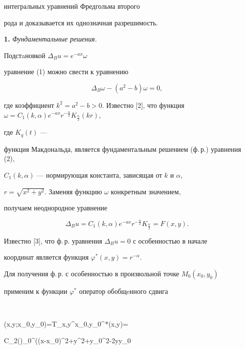интегральных уравнений Фредгольма второго


рода и доказывается их однозначная разрешимость.


 


{\bf 1.} {\it Фундаментальные решения.}


Подстaновкой $\Delta_{B}u=e^{-ax}\omega$


уравнение (1) можно свести к уравнению


\begin{equation}


\Delta_{B}\omega-(a^{2}-b)\omega=0,


\end{equation}


где коэффициент $k^{2}=a^{2}-b>0$. Известно [2], что функция $\omega=C_{1}(k,


\alpha)e^{-ax}r^{-\frac{\alpha}{2}}K_{\frac{\alpha}{2}}(kr)$,


где $K_{q}(t)$ ---


функция Макдональда, является фундаментальным решением (ф.\,р.) уравнения (2),


$C_{1}(k,\alpha)$ --- нормирующая константа, зависящая от $k$ и $\alpha$,


$r=\sqrt{x^{2}+y^{2}}$. Заменяя функцию $\omega$ конкретным значением,


получаем неоднородное уравнение


\begin{equation}


\Delta_{B}u=C_{1}(k,\alpha)e^{-ax}r^{-\frac{\alpha}{2}}


K_{\frac{\alpha}{2}}=F(x,y).


\end{equation}





Известно [3], что ф.\,р. уравнения $\Delta_{B}u=0$ с особенностью в начале


координат является функция $\varphi ^{*}(x,y)=r^{-\alpha}.$


Для получения ф.\,р. с особенностью в произвольной точке $M_{0}(x_{0},y_{0})$


применим к функции $\varphi^{*}$ оператор обобщeнного сдвига 


$$


\varphi(x,y;x_{0},y_{0})=T_{x,y}^{x_{0},y_{0}}\varphi^{*}(x,y)=


C_{2}(\alpha)\int_{0}^{\pi}((x-x_{0})^{2}+y^{2}+y_{0}^{2}-2yy_{0}\cos


